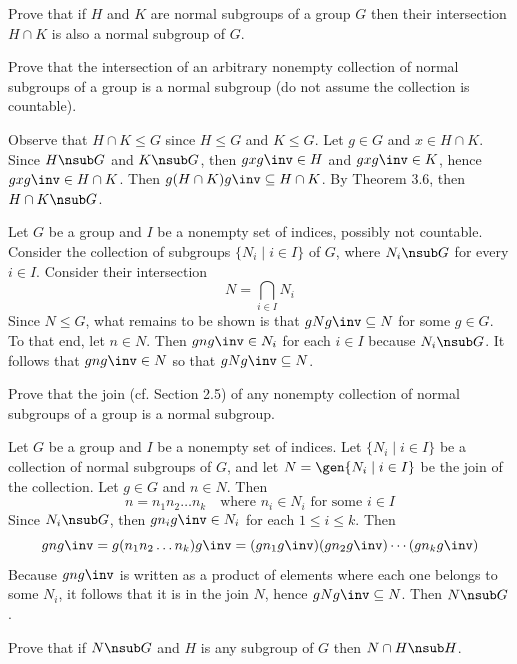 \begin{problems}
    \item
    \begin{problems}
        \item Prove that if $H$ and $K$ are normal subgroups of a group $G$ then their intersection $H \cap K$ is also a normal subgroup of $G$.
        \item Prove that the intersection of an arbitrary nonempty collection of normal subgroups of a group is a normal subgroup (do not assume the collection is countable).
    \end{problems}
    \begin{solalph}
        \item Observe that $H \cap K \leq G$ since $H \leq G$ and $K \leq G$. Let $g \in G$ and $x \in H \cap K$. Since $H \nsub G$ and $K \nsub G$, then $gxg\inv \in H$ and $gxg\inv \in K$, hence $gxg\inv \in H \cap K$. Then $g(H \cap K)g\inv \subseteq H \cap K$. By Theorem 3.6, then $H \cap K \nsub G$.
        \item Let $G$ be a group and $I$ be a nonempty set of indices, possibly not countable. Consider the collection of subgroups $\{N_i \mid i \in I\}$ of $G$, where $N_i \nsub G$ for every $i \in I$. Consider their intersection
        \[N = \bigcap_{i \in I} N_i\]
        Since $N \leq G$, what remains to be shown is that $gNg\inv \subseteq N$ for some $g \in G$. To that end, let $n \in N$. Then $gng\inv \in N_i$ for each $i \in I$ because $N_i \nsub G$. It follows that $gng\inv \in N$ so that $gNg\inv \subseteq N$.
    \end{solalph}
    \item Prove that the join (cf. Section 2.5) of any nonempty collection of normal subgroups of a group is a normal subgroup.
    \begin{sol}
        Let $G$ be a group and $I$ be a nonempty set of indices. Let $\{N_i \mid i \in I\}$ be a collection of normal subgroups of $G$, and let $N = \gen{N_i \mid i \in I}$ be the join of the collection. Let $g \in G$ and $n \in N$. Then
        \[n = n_1n_2 \dots n_k \quad \text{where $n_i \in N_i$ for some $i \in I$}\]
        Since $N_i \nsub G$, then $gn_ig\inv \in N_i$ for each $1 \leq i \leq k$. Then
        \[gng\inv = g(n_1n_2 \ldots n_k)g\inv = (gn_1g\inv)(gn_2g\inv) \cdots (gn_kg\inv)\]
        Because $gng\inv$ is written as a product of elements where each one belongs to some $N_i$, it follows that it is in the join $N$, hence $gNg\inv \subseteq N$. Then $N \nsub G$.
    \end{sol}
    \item Prove that if $N \nsub G$ and $H$ is any subgroup of $G$ then $N \cap H \nsub H$.

\end{problems}
